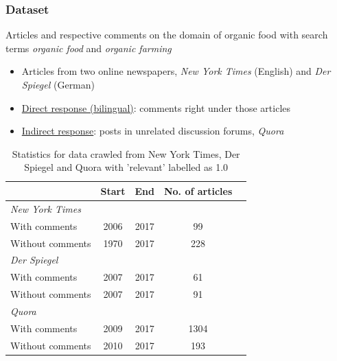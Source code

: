 \documentclass{tum-presentation}
\begin{document}
\begin{frame}
  \frametitle{Dataset}
  \large
  \begin{description}
    \item Articles and respective comments on the domain of organic food with search terms \emph{organic food} and \emph{organic farming}
    \begin{itemize}
      \item Articles from two online newspapers, \emph{New York Times} (English) and \emph{Der Spiegel} (German)
      \item 
      \underline{Direct response (bilingual)}: comments right under those articles
      \item 
      \underline{Indirect response}: posts in unrelated discussion forums, \emph{Quora}
    \end{itemize}
  \end{description}
  \small
  \begin{table}[t]
    \begin{tabular}{lcccc}
    \hline
    & Start & End & No. of articles\\
    \hline
    \emph{New York Times}\\ 
    \hline
    With comments & 2006 & 2017 & 99\\
    Without comments & 1970 & 2017 & 228\\
    \hline
    \emph{Der Spiegel}\\
    \hline
    With comments & 2007 & 2017 & 61\\
    Without comments & 2007 & 2017 & 91\\
    \hline
    \emph{Quora}\\
    \hline
    With comments & 2009 & 2017 & 1304\\
    Without comments & 2010 & 2017 & 193\\
    \hline
    \end{tabular}
    \caption{Statistics for data crawled from New York Times, Der Spiegel and Quora with 'relevant' labelled as 1.0}
    \label{ex:table}
  \end{table}
\end{frame}
\end{document}
